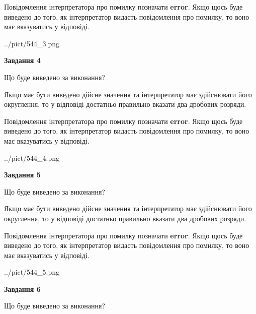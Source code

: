 \documentclass[12pt, ukrainian]{article}
\begin{document}
{\begin {Large}
Повідомлення інтерпретатора про помилку позначати \textbf{error}.
Якщо щось буде виведено до того, як інтерпретатор видасть повідомлення про помилку, 
то воно має вказуватись у відповіді. \par

\begin{center}
	{../pict/544_3.png}
\end{center}
\newpage

{\begin {center}\textbf{Завдання 4}\end {center}}\par
Що буде виведено за виконання? \par

Якщо має бути виведено дійсне значення та інтерпретатор має здійснювати його округлення, 
то у відповіді достатньо правильно вказати два дробових розряди.

Повідомлення інтерпретатора про помилку позначати \textbf{error}.
Якщо щось буде виведено до того, як інтерпретатор видасть повідомлення про помилку, 
то воно має вказуватись у відповіді. \par

\begin{center}
	{../pict/544_4.png}
\end{center}
\newpage

{\begin {center}\textbf{Завдання 5}\end {center}}\par
Що буде виведено за виконання? \par

Якщо має бути виведено дійсне значення та інтерпретатор має здійснювати його округлення, 
то у відповіді достатньо правильно вказати два дробових розряди.

Повідомлення інтерпретатора про помилку позначати \textbf{error}.
Якщо щось буде виведено до того, як інтерпретатор видасть повідомлення про помилку, 
то воно має вказуватись у відповіді. \par

\begin{center}
	{../pict/544_5.png}
\end{center}
\newpage

{\begin {center}\textbf{Завдання 6}\end {center}}\par
Що буде виведено за виконання? \par


\end{Large}}
\end{document}
